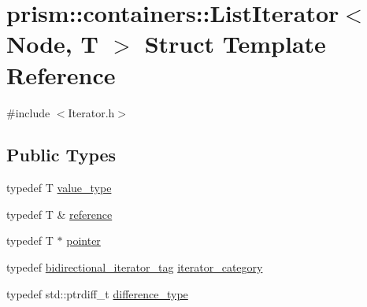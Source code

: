 \hypertarget{structprism_1_1containers_1_1_list_iterator}{}\section{prism\+:\+:containers\+:\+:List\+Iterator$<$ Node, T $>$ Struct Template Reference}
\label{structprism_1_1containers_1_1_list_iterator}


{\ttfamily \#include $<$Iterator.\+h$>$}

\subsection*{Public Types}
\begin{DoxyCompactItemize}
\item 
typedef T \hyperlink{structprism_1_1containers_1_1_list_iterator_a09ec679d2e078abe6f1debf80c494300}{value\+\_\+type}
\item 
typedef T \& \hyperlink{structprism_1_1containers_1_1_list_iterator_a70680642555c1d031e3e99e66b89680d}{reference}
\item 
typedef T $\ast$ \hyperlink{structprism_1_1containers_1_1_list_iterator_a2e2390561608db7ef1938a21f32e7314}{pointer}
\item 
typedef \hyperlink{structprism_1_1containers_1_1bidirectional__iterator__tag}{bidirectional\+\_\+iterator\+\_\+tag} \hyperlink{structprism_1_1containers_1_1_list_iterator_a83c92f7564a56d9597dfc6e10c79cc78}{iterator\+\_\+category}
\item 
typedef std\+::ptrdiff\+\_\+t \hyperlink{structprism_1_1containers_1_1_list_iterator_a5d36bc90dfcc66e888054ac1fa8de786}{difference\+\_\+type}
\end{DoxyCompactItemize}
